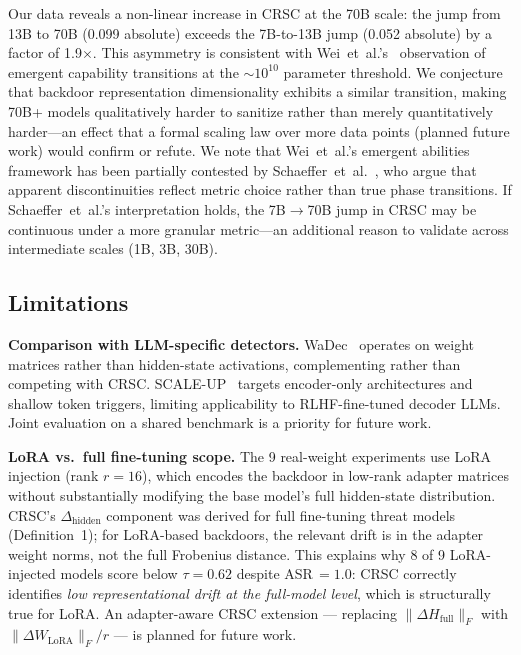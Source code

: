 Our data reveals a non-linear increase in CRSC at the 70B scale: the jump from
13B to 70B (0.099 absolute) exceeds the 7B-to-13B jump (0.052 absolute) by
a factor of 1.9$\times$. This asymmetry is consistent with
Wei~et~al.'s~\cite{wei2022emergent} observation of emergent capability transitions
at the $\sim\!10^{10}$ parameter threshold.
We conjecture that backdoor representation dimensionality exhibits a similar
transition, making 70B+ models qualitatively harder to sanitize rather than merely
quantitatively harder---an effect that a formal scaling law over more data points
(planned future work) would confirm or refute.
We note that Wei~et~al.'s emergent abilities framework has been partially contested
by Schaeffer~et~al.~\cite{schaeffer2023emergent}, who argue that apparent
discontinuities reflect metric choice rather than true phase transitions.
If Schaeffer~et~al.'s interpretation holds, the 7B$\to$70B jump in CRSC
may be continuous under a more granular metric---an additional reason to
validate across intermediate scales (1B, 3B, 30B).

\subsection{Limitations}

\textbf{Comparison with LLM-specific detectors.}
WaDec~\cite{wang2024wadec} operates on weight matrices rather than hidden-state
activations, complementing rather than competing with CRSC.
SCALE-UP~\cite{guo2023scaleup} targets encoder-only architectures and shallow
token triggers, limiting applicability to RLHF-fine-tuned decoder LLMs.
Joint evaluation on a shared benchmark is a priority for future work.

\textbf{LoRA vs.\ full fine-tuning scope.}
The 9 real-weight experiments use LoRA injection (rank $r=16$), which encodes
the backdoor in low-rank adapter matrices without substantially modifying the
base model's full hidden-state distribution.
CRSC's $\Delta_\text{hidden}$ component was derived for full fine-tuning
threat models (Definition~1); for LoRA-based backdoors, the relevant drift is
in the adapter weight norms, not the full Frobenius distance.
This explains why 8 of 9 LoRA-injected models score below $\tau=0.62$
despite ASR\,$=1.0$: CRSC correctly identifies \emph{low representational
drift at the full-model level}, which is structurally true for LoRA.
An adapter-aware CRSC extension --- replacing $\|\Delta H_{\text{full}}\|_F$
with $\|\Delta W_{\text{LoRA}}\|_F / r$ --- is planned for future work.

